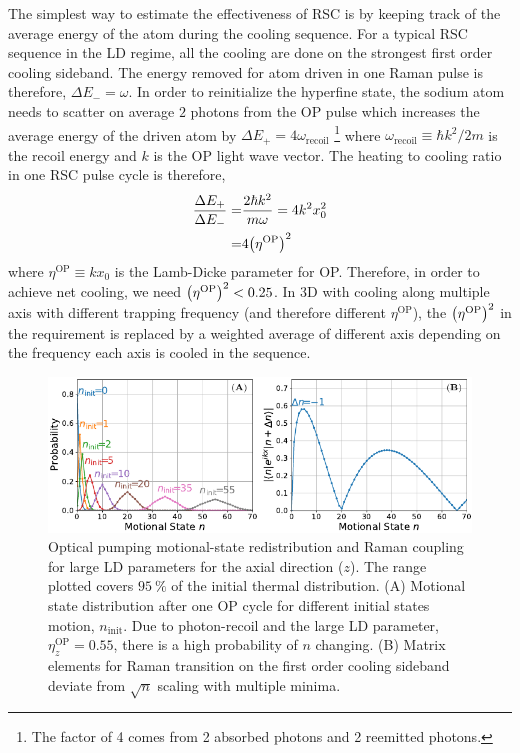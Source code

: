 The simplest way to estimate the effectiveness of RSC
is by keeping track of the average energy of the atom during the cooling sequence.
For a typical RSC sequence in the LD regime, all the cooling are done on
the strongest first order cooling sideband.
The energy removed for atom driven in one Raman pulse is therefore, $\Delta E_-=\omega$.
In order to reinitialize the hyperfine state, the sodium atom needs to scatter on average
$2$ photons from the OP pulse which increases the average energy of the driven atom
by $\Delta E_+=4\omega_{\mathrm{recoil}}$
\footnote{The factor of 4 comes from 2 absorbed photons and 2 reemitted photons.}
where $\omega_{\mathrm{recoil}}\equiv \hbar k^2/2m$ is the recoil energy\cite{steck_sodium_nodate}
and $k$ is the OP light wave vector.
The heating to cooling ratio in one RSC pulse cycle is therefore,
\begin{align*}
  \frac{\Delta E_+}{\Delta E_-}=&\frac{2\hbar k^2}{m\omega}=4k^2x_0^2\\
  =&4{\left({\eta^{\mathrm{OP}}}\right)}^2
\end{align*}
where $\eta^{\mathrm{OP}}\equiv kx_0$ is the Lamb-Dicke parameter for OP.
Therefore, in order to achieve net cooling, we need ${\left({\eta^{\mathrm{OP}}}\right)}^2<0.25$.
In 3D with cooling along multiple axis with different trapping frequency
(and therefore different $\eta^{\mathrm{OP}}$), the ${\left({\eta^{\mathrm{OP}}}\right)}^2$ in the requirement
is replaced by a weighted average of different axis depending on the frequency
each axis is cooled in the sequence.

\begin{figure}
  \centering
  \includegraphics[width=\textwidth]{figures/na_rsc_challenges.pdf}
  \caption[Optical pumping motional-state redistribution and Raman coupling]{
    Optical pumping motional-state redistribution and Raman coupling for large LD parameters
    for the axial direction ($z$).
    The range plotted covers $95~\%$ of the initial thermal distribution.
    (A) Motional state distribution after one OP cycle for different initial states motion,
    $n_{\textrm{init}}$.
    Due to photon-recoil and the large LD parameter, $\eta^{\textrm{OP}}_z=0.55$,
    there is a high probability of $n$ changing.
    (B) Matrix elements for Raman transition on the first order cooling sideband
    deviate from $\sqrt{n}$ scaling with multiple minima.
    \label{fig:rsc:na-challenges}}
\end{figure}

